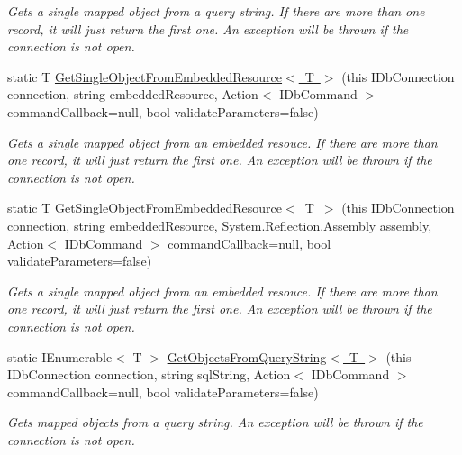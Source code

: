 \begin{DoxyCompactItemize}
\begin{DoxyCompactList}\small\item\em Gets a single mapped object from a query string. If there are more than one record, it will just return the first one. An exception will be thrown if the connection is not open. \end{DoxyCompactList}\item 
static T \mbox{\hyperlink{class_blue_cloud_1_1_extensions_1_1_data_1_1_i_db_connection_extensions_a20549e54528ba4334ca7113fa68943f2}{Get\+Single\+Object\+From\+Embedded\+Resource$<$ T $>$}} (this I\+Db\+Connection connection, string embedded\+Resource, Action$<$ I\+Db\+Command $>$ command\+Callback=null, bool validate\+Parameters=false)
\begin{DoxyCompactList}\small\item\em Gets a single mapped object from an embedded resouce. If there are more than one record, it will just return the first one. An exception will be thrown if the connection is not open. \end{DoxyCompactList}\item 
static T \mbox{\hyperlink{class_blue_cloud_1_1_extensions_1_1_data_1_1_i_db_connection_extensions_aa53b10a5834036e0e2246b50a8bcf6b4}{Get\+Single\+Object\+From\+Embedded\+Resource$<$ T $>$}} (this I\+Db\+Connection connection, string embedded\+Resource, System.\+Reflection.\+Assembly assembly, Action$<$ I\+Db\+Command $>$ command\+Callback=null, bool validate\+Parameters=false)
\begin{DoxyCompactList}\small\item\em Gets a single mapped object from an embedded resouce. If there are more than one record, it will just return the first one. An exception will be thrown if the connection is not open. \end{DoxyCompactList}\item 
static I\+Enumerable$<$ T $>$ \mbox{\hyperlink{class_blue_cloud_1_1_extensions_1_1_data_1_1_i_db_connection_extensions_adb831f47624e0f8d9cbf85346b804c8f}{Get\+Objects\+From\+Query\+String$<$ T $>$}} (this I\+Db\+Connection connection, string sql\+String, Action$<$ I\+Db\+Command $>$ command\+Callback=null, bool validate\+Parameters=false)
\begin{DoxyCompactList}\small\item\em Gets mapped objects from a query string. An exception will be thrown if the connection is not open. \end{DoxyCompactList}\item 

\end{DoxyCompactItemize}
